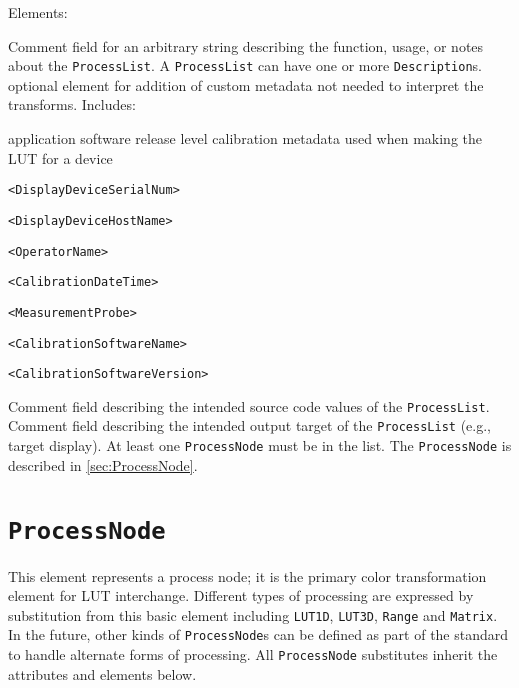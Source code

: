 Elements:	
\begin{xmlfields}
    \xmlitem[Description][required] Comment field for an arbitrary string describing the function, usage, or notes about the \texttt{ProcessList}. A \texttt{ProcessList} can have one or more \texttt{Description}s.
    \xmlitem[Info][optional] optional element for addition of custom metadata not needed to interpret the transforms. Includes:
    	\begin{xmlfields}
			\xmlitem[AppRelease][optional] application software release level
			\xmlitem[CalibrationInfo][optional] calibration metadata used when making the LUT for a device
			\begin{list}{}{\setlength{\itemsep}{4pt}}
				\item \texttt{\textless DisplayDeviceSerialNum\textgreater}
				\item \texttt{\textless DisplayDeviceHostName\textgreater}
				\item \texttt{\textless OperatorName\textgreater}
				\item \texttt{\textless CalibrationDateTime\textgreater}
				\item \texttt{\textless MeasurementProbe\textgreater}
				\item \texttt{\textless CalibrationSoftwareName\textgreater}
				\item \texttt{\textless CalibrationSoftwareVersion\textgreater}
			\end{list}
    	\end{xmlfields}
    \xmlitem[InputDescriptor][optional] Comment field describing the intended source code values of the \texttt{ProcessList}.
    \xmlitem[OutputDescriptor][optional] Comment field describing the intended output target of the \texttt{ProcessList} (e.g., target display).
    \xmlitem[ProcessNode][required] At least one \texttt{ProcessNode} must be in the list. The \texttt{ProcessNode} is described in \autoref{sec:ProcessNode}.
\end{xmlfields}

\section{\texttt{ProcessNode}}
\label{sec:ProcessNode}
This element represents a process node; it is the primary color transformation element for LUT interchange. Different types of processing are expressed by substitution from this basic element including \texttt{LUT1D}, \texttt{LUT3D}, \texttt{Range} and \texttt{Matrix}. In the future, other kinds of \texttt{ProcessNode}s can be defined as part of the standard to handle alternate forms of processing. All \texttt{ProcessNode} substitutes inherit the attributes and elements below.

